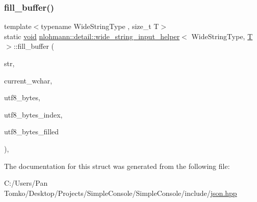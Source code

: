 \subsubsection{\texorpdfstring{fill\_buffer()}{fill\_buffer()}}
{\footnotesize\ttfamily template$<$typename Wide\+String\+Type , size\+\_\+t T$>$ \\
static \mbox{\hyperlink{namespacenlohmann_1_1detail_a59fca69799f6b9e366710cb9043aa77d}{void}} \mbox{\hyperlink{structnlohmann_1_1detail_1_1wide__string__input__helper}{nlohmann\+::detail\+::wide\+\_\+string\+\_\+input\+\_\+helper}}$<$ Wide\+String\+Type, \mbox{\hyperlink{_keyboard_event_8h_adf1f3edb9115acb0a1e04209b7a9937b}{T}} $>$\+::fill\+\_\+buffer (\begin{DoxyParamCaption}\item[{const Wide\+String\+Type \&}]{str,  }\item[{size\+\_\+t \&}]{current\+\_\+wchar,  }\item[{\mbox{\hyperlink{namespacenlohmann_1_1detail_a1ed8fc6239da25abcaf681d30ace4985af1f713c9e000f5d3f280adbd124df4f5}{std\+::array}}$<$ std\+::char\+\_\+traits$<$ char $>$\+::int\+\_\+type, 4 $>$ \&}]{utf8\+\_\+bytes,  }\item[{size\+\_\+t \&}]{utf8\+\_\+bytes\+\_\+index,  }\item[{size\+\_\+t \&}]{utf8\+\_\+bytes\+\_\+filled }\end{DoxyParamCaption})\hspace{0.3cm}{\ttfamily [inline]}, {\ttfamily [static]}}



The documentation for this struct was generated from the following file\+:\begin{DoxyCompactItemize}
\item 
C\+:/\+Users/\+Pan Tomko/\+Desktop/\+Projects/\+Simple\+Console/\+Simple\+Console/include/\mbox{\hyperlink{json_8hpp}{json.\+hpp}}\end{DoxyCompactItemize}
